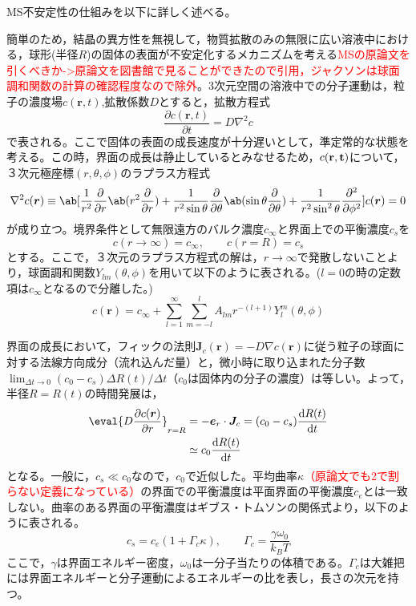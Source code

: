 \documentclass[autodetect-engine,dvi=dvipdfmx,a4paper,ja=standard,oneside,openany,11pt,draft]{bxjsbook}
\begin{document}
MS不安定性の仕組みを以下に詳しく述べる。

簡単のため，結晶の異方性を無視して，物質拡散のみの無限に広い溶液中における，球形(半径$R$)の固体の表面が不安定化するメカニズムを考える\cite{フラクタル科学}\cite{mullins1963morphological}\textcolor{red}{MSの原論文を引くべきか->原論文を図書館で見ることができたので引用，ジャクソンは球面調和関数の計算の確認程度なので除外}。3次元空間の溶液中での分子運動は，粒子の濃度場$c(\bm{r},t)$,拡散係数$D$とすると，拡散方程式
\begin{equation}
  \frac{\partial c(\bm{r},t)}{\partial t} = D\nabla^2c
  \label{eq:diffusion}
\end{equation}
で表される。ここで固体の表面の成長速度が十分遅いとして，準定常的な状態を考える。この時，界面の成長は静止しているとみなせるため，$c(\bf{r},t)$について，３次元極座標$(r,\theta,\phi)$のラプラス方程式
\begin{equation}
  \nabla^2c(\bm{r})\equiv \ab[\frac{1}{r^2}\pdv*{\ab(r^2\pdv{}{r})}{r}+\frac{1}{r^2\sin\theta}\pdv*{\ab(\sin\theta\pdv{}{\theta})}{\theta}+\frac{1}{r^2\sin^2\theta}\pdv[2]{}{\phi}]c(\bm{r})=0
  \label{eq:laplace}
\end{equation}
が成り立つ。境界条件として無限遠方のバルク濃度$c_{\infty}$と界面上での平衡濃度$c_s$を
\begin{equation}
  c(r\rightarrow \infty)  = c_{\infty}, \qquad c(r=R)= c_s
  \label{eq:boundary}
\end{equation}
とする。ここで，３次元のラプラス方程式の解は，$r\to\infty$で発散しないことより，球面調和関数$Y_{lm}(\theta,\phi)$を用いて以下のように表される。($l=0$の時の定数項は$c_\infty$となるので分離した。)
\begin{equation}
  c(\bm{r}) = c_{\infty} + \sum_{l=1}^{\infty}\sum_{m=-l}^{l}A_{lm}r^{-(l+1)}Y_{l}^{m}(\theta,\phi)
  \label{eq:spherical}
\end{equation}

界面の成長において，フィックの法則$\bm{J}_c(\bm{r})=-D\nabla c(\bm{r})$に従う粒子の球面に対する法線方向成分（流れ込んだ量）と，微小時に取り込まれた分子数$\lim_{\Delta t\to 0} (c_0-c_s)\Delta R(t)/\Delta t$（$c_0$は固体内の分子の濃度）は等しい。よって，半径$R=R(t)$の時間発展は，
\begin{equation}
  \begin{split}
    \eval{D\pdv{c(\bm{r})}{r}}_{r=R} & = -\bm{e}_r\cdot\bm{J}_c = (c_0-c_s)\odv{R(t)}{t} \\
                                     & \simeq c_0\odv{R(t)}{t}
  \end{split}
  \label{eq:R}
\end{equation}
となる。一般に，$c_s\ll c_0$なので，$c_0$で近似した。平均曲率$\kappa$\textcolor{red}{（原論文でも2で割らない定義になっている）}の界面での平衡濃度は平面界面の平衡濃度$c_e$とは一致しない。曲率のある界面の平衡濃度はギブス・トムソンの関係式より，以下のように表される。
\begin{equation}
  c_s = c_e(1+\Gamma_c \kappa), \qquad \Gamma_c = \frac{\gamma \omega_0}{k_BT}
  \label{eq:Gibbs-Thomson}
\end{equation}
ここで，$\gamma$は界面エネルギー密度，$\omega_0$は一分子当たりの体積である。$\Gamma_c$は大雑把には界面エネルギーと分子運動によるエネルギーの比を表し，長さの次元を持つ。
\end{document}
